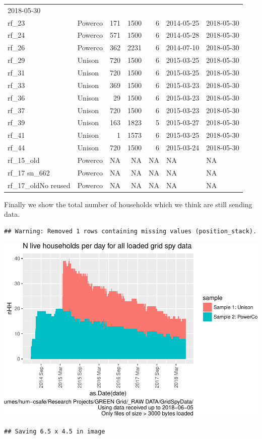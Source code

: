 \documentclass[]{article}
\begin{document}
\begin{longtable}[]{@{}llrrrll@{}}
2018-05-30\tabularnewline
rf\_23 & Powerco & 171 & 1500 & 6 & 2014-05-25 &
2018-05-30\tabularnewline
rf\_24 & Powerco & 571 & 1500 & 6 & 2014-05-28 &
2018-05-30\tabularnewline
rf\_26 & Powerco & 362 & 2231 & 6 & 2014-07-10 &
2018-05-30\tabularnewline
rf\_29 & Unison & 720 & 1500 & 6 & 2015-03-25 &
2018-05-30\tabularnewline
rf\_31 & Unison & 720 & 1500 & 6 & 2015-03-25 &
2018-05-30\tabularnewline
rf\_33 & Unison & 369 & 1500 & 6 & 2015-03-23 &
2018-05-30\tabularnewline
rf\_36 & Unison & 29 & 1500 & 6 & 2015-03-23 & 2018-05-30\tabularnewline
rf\_37 & Unison & 720 & 1500 & 6 & 2015-03-23 &
2018-05-30\tabularnewline
rf\_39 & Unison & 163 & 1823 & 5 & 2015-03-27 &
2018-05-30\tabularnewline
rf\_41 & Unison & 1 & 1573 & 6 & 2015-03-25 & 2018-05-30\tabularnewline
rf\_44 & Unison & 720 & 1500 & 6 & 2015-03-24 &
2018-05-30\tabularnewline
rf\_15\_old & Powerco & NA & NA & NA & NA & NA\tabularnewline
rf\_17 sn\_662 & Powerco & NA & NA & NA & NA & NA\tabularnewline
rf\_17\_oldNo reused & Powerco & NA & NA & NA & NA & NA\tabularnewline
\bottomrule
\end{longtable}

Finally we show the total number of households which we think are still
sending data.

\begin{verbatim}
## Warning: Removed 1 rows containing missing values (position_stack).
\end{verbatim}

\includegraphics{processGridSpy1minData_files/figure-latex/liveDataHouseholds-1.pdf}

\begin{verbatim}
## Saving 6.5 x 4.5 in image
\end{verbatim}
\end{document}
